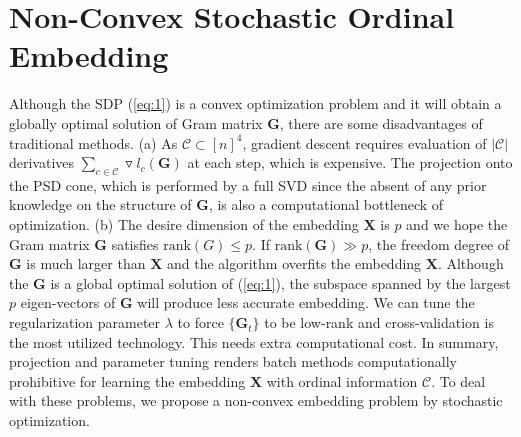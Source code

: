 \documentclass[letterpaper]{article}
\begin{document}
		\section{Non-Convex Stochastic Ordinal Embedding}
		Although the SDP (\ref{eq:1}) is a convex optimization problem and it will obtain a globally optimal solution of Gram matrix $\mathbf{G}$, there are some disadvantages of traditional methods. (a) As $\mathcal{C}\subset[n]^4$, gradient descent requires evaluation of $|\mathcal{C}|$ derivatives $\sum_{c\in\mathcal{C}}\triangledown l_c(\mathbf{G})$ at each step, which is expensive. The projection onto the PSD cone, which is performed by a full SVD since the absent of any prior knowledge on the structure of $\mathbf{G}$, is also a computational bottleneck of optimization. (b) The desire dimension of the embedding $\mathbf{X}$ is $p$ and we hope the Gram matrix $\mathbf{G}$ satisfies $\text{rank}(G)\leq p$. If $\text{rank}(\mathbf{G})\gg p$, the freedom degree of $\mathbf{G}$ is much larger than $\mathbf{X}$ and the algorithm overfits the embedding $\mathbf{X}$. Although the $\mathbf{G}$ is a global optimal solution of (\ref{eq:1}), the subspace spanned by the largest $p$ eigen-vectors of $\mathbf{G}$ will produce less accurate embedding. We can tune the regularization parameter $\lambda$ to force $\{\mathbf{G}_t\}$ to be low-rank and cross-validation is the most utilized technology. This needs extra computational cost. In summary, projection and parameter tuning renders batch methods computationally prohibitive for learning the embedding $\mathbf{X}$ with ordinal information $\mathcal{C}$. To deal with these problems, we propose a non-convex embedding problem by stochastic optimization.
\end{document}
